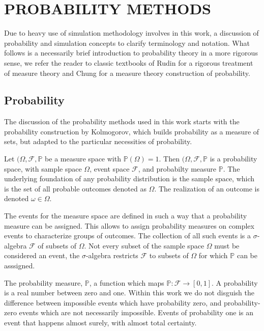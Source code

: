 \chapter{PROBABILITY METHODS}
\label{ch:probability}

Due to heavy use of simulation methodology involves in this work, a discussion of probability and simulation concepts to clarify terminology and notation.  What follows is a necessarily brief introduction to probability theory in a more rigorous sense, we refer the reader to classic textbooks of Rudin\cite{rudin1987_realanalysis} for a rigorous treatment of measure theory and Chung\cite{chung2001_probabilitytheory} for a measure theory construction of probability.

\section{Probability}
The discussion of the probability methods used in this work starts with the probability construction by Kolmogorov, which builds probability as a measure of sets, but adapted to the particular necessities of probability.

Let $(\Omega,\mathcal{F},\mathbb{P}$ be a measure space with $\mathbb{P}(\Omega)=1$.  Then $(\Omega,\mathcal{F},\mathbb{P}$ is a probability space, with sample space $\Omega$, event space $\mathcal{F}$, and probabilty measure $\mathbb{P}$.  The underlying foundation of any probability  distribution is the sample space, which is the set of all probable outcomes denoted as $\Omega$.  The realization of an outcome is denoted $\omega \in \Omega$.

The events for the measure space are defined in such a way that a probability measure can be assigned.  This allows to assign probability measures on complex events to characterize groups of outcomes.  The collection of all such events is a $\sigma$-algebra $\mathcal{F}$ of subsets of $\Omega$.  Not every subset of the sample space $\Omega$ must be considered an event, the $\sigma$-algebra restricts $\mathcal{F}$ to subsets of $\Omega$ for which $\mathbb{P}$ can be asssigned.

The probability measure, $\mathbb{P}$, a function which maps $\mathbb{P}:\mathcal{F}\rightarrow[0,1]$.  A probability is a real number between zero and one.  Within this work we do not disguish the difference between impossible events which have probability zero, and probability-zero events which are not necessarily impossible.  Events of probability one is an event that happens almost surely, with almost total certainty.

